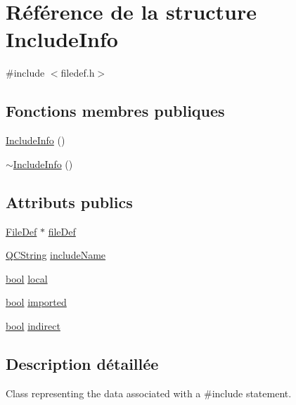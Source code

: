 \hypertarget{struct_include_info}{}\section{Référence de la structure Include\+Info}
\label{struct_include_info}


{\ttfamily \#include $<$filedef.\+h$>$}

\subsection*{Fonctions membres publiques}
\begin{DoxyCompactItemize}
\item 
\hyperlink{struct_include_info_a0240d2d2720adacd4821c605d2e508dc}{Include\+Info} ()
\item 
\hyperlink{struct_include_info_a0e6de4a8654d94c8bf316ed07ac9654b}{$\sim$\+Include\+Info} ()
\end{DoxyCompactItemize}
\subsection*{Attributs publics}
\begin{DoxyCompactItemize}
\item 
\hyperlink{class_file_def}{File\+Def} $\ast$ \hyperlink{struct_include_info_a29386ee70ad3c80623571b7af55ed8f0}{file\+Def}
\item 
\hyperlink{class_q_c_string}{Q\+C\+String} \hyperlink{struct_include_info_a0f8b77f07d748ea1612db5d4c47c5c37}{include\+Name}
\item 
\hyperlink{qglobal_8h_a1062901a7428fdd9c7f180f5e01ea056}{bool} \hyperlink{struct_include_info_a1455653edfa732656ee4f77d72adae40}{local}
\item 
\hyperlink{qglobal_8h_a1062901a7428fdd9c7f180f5e01ea056}{bool} \hyperlink{struct_include_info_a733eb5a7223f7619cfa7d5e390d5c224}{imported}
\item 
\hyperlink{qglobal_8h_a1062901a7428fdd9c7f180f5e01ea056}{bool} \hyperlink{struct_include_info_a14646bcb52c3c65d8fc0093614334c8e}{indirect}
\end{DoxyCompactItemize}


\subsection{Description détaillée}
Class representing the data associated with a \#include statement. 

